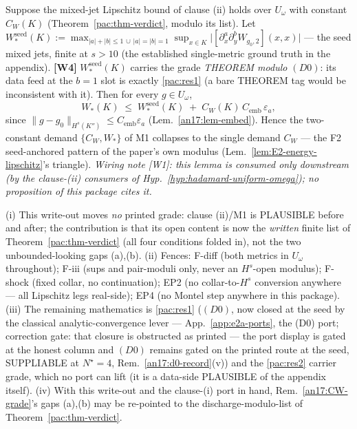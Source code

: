 \begin{lemma}\label{pac:lem-B}
Suppose the mixed-jet Lipschitz bound of clause (ii) holds over
$U_\omega$ with constant $C_W(K)$ (Theorem~\ref{pac:thm-verdict},
modulo its list). Let $W^{\mathrm{seed}}_*(K):=
\max_{|a|+|b|\le1\,\cup\,|a|=|b|=1}\sup_{x\in K}
\bigl|[\partial_x^a\partial_y^bW_{g_0,2}](x,x)\bigr|$ --- the seed
mixed jets, finite at $s>10$ (the established single-metric ground truth in the appendix). \textbf{[W4]}
$W^{\mathrm{seed}}_*(K)$ carries the grade \emph{THEOREM modulo
$(D0)$}: its data feed at the $b{=}1$ slot is exactly
\ref{pac:res1} (a bare THEOREM tag would be inconsistent with it). Then for every
$g\in U_\omega$,
\[
  W_*(K)\;\le\;W^{\mathrm{seed}}_*(K)
  \;+\;C_W(K)\,C_{\mathrm{emb}}\,\varepsilon_a ,
\]
since $\|g-g_0\|_{H^s(K'')}\le C_{\mathrm{emb}}\varepsilon_a$
(Lem.~\ref{an17:lem-embed}). Hence the two-constant demand
$\{C_W,W_*\}$ of M1 collapses to the single demand $C_W$ --- the F2
seed-anchored pattern of the paper's own modulus
(Lem.~\ref{lem:E2-energy-lipschitz}'s triangle).
\emph{Wiring note [W1]: this lemma is consumed only downstream
(by the clause-(ii) consumers of Hyp.~\ref{hyp:hadamard-uniform-omega}); no
proposition of this package cites it.}
\end{lemma}

\begin{remark}
\label{pac:rem-grade}
(i) This write-out moves \emph{no} printed grade: clause (ii)/M1 is
PLAUSIBLE before and after; the contribution is that its open content
is now the \emph{written} finite list of Theorem~\ref{pac:thm-verdict}
(all four conditions folded in), not the two unbounded-looking gaps (a),(b).
(ii) Fences: F-diff (both metrics in $U_\omega$ throughout); F-iii
(sups and pair-moduli only, never an $H^s$-open modulus); F-shock
(fixed collar, no continuation); EP2 (no collar-to-$H^s$ conversion
anywhere --- all Lipschitz legs real-side); EP4 (no Montel step
anywhere in this package). (iii) The remaining mathematics is
\ref{pac:res1} ($(D0)$, now closed at the seed by the classical
analytic-convergence lever --- App.~\ref{app:e2a-ports}, the (D0)
port; correction gate: that closure is obstructed as printed --- the port
display is gated at the honest column and $(D0)$ remains gated on the printed route at the seed, SUPPLIABLE
at $N^\star{=}4$, Rem.~\ref{an17:d0-record}(v)) and the \ref{pac:res2} carrier grade,
which no port can lift (it is a data-side PLAUSIBLE of the appendix
itself). (iv) With this write-out and the clause-(i) port in hand,
Rem.~\ref{an17:CW-grade}'s gaps (a),(b) may be re-pointed to the
discharge-modulo-list of Theorem~\ref{pac:thm-verdict}.
\end{remark}
